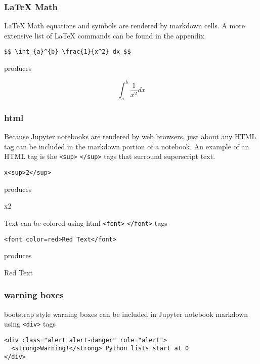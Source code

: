 \documentclass{book}
\newcommand{\passthrough}[1]{#1}
\begin{document}
\hypertarget{latex-math}{%
\subsubsection{LaTeX Math}\label{latex-math}}

LaTeX Math equations and symbols are rendered by markdown cells. A more
extensive list of LaTeX commands can be found in the appendix.

\begin{lstlisting}
$$ \int_{a}^{b} \frac{1}{x^2} dx $$
\end{lstlisting}

produces

\[ \int_{a}^{b} \frac{1}{x^2} dx \]

\hypertarget{html}{%
\subsubsection{html}\label{html}}

Because Jupyter notebooks are rendered by web browsers, just about any
HTML tag can be included in the markdown portion of a notebook. An
example of an HTML tag is the \passthrough{\lstinline!<sup>!}
\passthrough{\lstinline!</sup>!} tags that surround superscript text.

\begin{lstlisting}
x<sup>2</sup>
\end{lstlisting}

produces

x2

Text can be colored using html \passthrough{\lstinline!<font>!}
\passthrough{\lstinline!</font>!} tags

\begin{lstlisting}
<font color=red>Red Text</font>
\end{lstlisting}

produces

Red Text

\hypertarget{warning-boxes}{%
\subsubsection{warning boxes}\label{warning-boxes}}

bootstrap style warning boxes can be included in Jupyter notebook
markdown using \passthrough{\lstinline!<div>!} tags

\begin{lstlisting}
<div class="alert alert-danger" role="alert">
  <strong>Warning!</strong> Python lists start at 0
</div>
\end{lstlisting}
\end{document}
